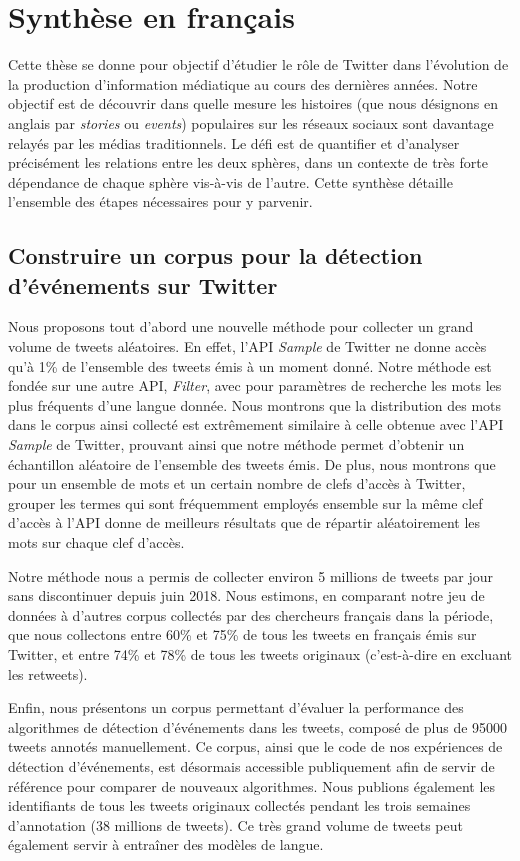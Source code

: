 \chapter*{Synthèse en français}

Cette thèse se donne pour objectif d'étudier le rôle de Twitter dans l'évolution de la production d'information médiatique au cours des dernières années. Notre objectif est de découvrir dans quelle mesure les histoires (que nous désignons en anglais par \textit{stories} ou \textit{events}) populaires sur les réseaux sociaux sont davantage relayés par les médias traditionnels. Le défi est de quantifier et d'analyser précisément les relations entre les deux sphères, dans un contexte de très forte dépendance de chaque sphère vis-à-vis de l'autre. Cette synthèse détaille l'ensemble des étapes nécessaires pour y parvenir.

\section*{Construire un corpus pour la détection d'événements sur Twitter}
Nous proposons tout d'abord une nouvelle méthode pour collecter un grand volume de tweets aléatoires. En effet, l'API \textit{Sample} de Twitter ne donne accès qu'à 1\% de l'ensemble des tweets émis à un moment donné. Notre méthode est fondée sur une autre API, \textit{Filter}, avec pour paramètres de recherche les mots les plus fréquents d'une langue donnée. Nous montrons que la distribution des mots dans le corpus ainsi collecté est extrêmement similaire à celle obtenue avec l'API \textit{Sample} de Twitter, prouvant ainsi que notre méthode permet d'obtenir un échantillon aléatoire de l'ensemble des tweets émis. De plus, nous montrons que pour un ensemble de mots et un certain nombre de clefs d'accès à Twitter, grouper les termes qui sont fréquemment employés ensemble sur la même clef d'accès à l'API donne de meilleurs résultats que de répartir aléatoirement les mots sur chaque clef d'accès.

Notre méthode nous a permis de collecter environ 5 millions de tweets par jour sans discontinuer depuis juin 2018. Nous estimons, en comparant notre jeu de données à d'autres corpus collectés par des chercheurs français dans la période, que nous collectons entre 60\% et 75\% de tous les tweets en français émis sur Twitter, et entre 74\% et 78\% de tous les tweets originaux (c'est-à-dire en excluant les retweets).

Enfin, nous présentons un corpus permettant d'évaluer la performance des algorithmes de détection d'événements dans les tweets, composé de plus de 95000 tweets annotés manuellement. Ce corpus, ainsi que le code de nos expériences de détection d'événements, est désormais accessible publiquement afin de servir de référence pour comparer de nouveaux algorithmes. Nous publions également les identifiants de tous les tweets originaux collectés pendant les trois semaines d'annotation (38 millions de tweets). Ce très grand volume de tweets peut également servir à entraîner des modèles de langue.

